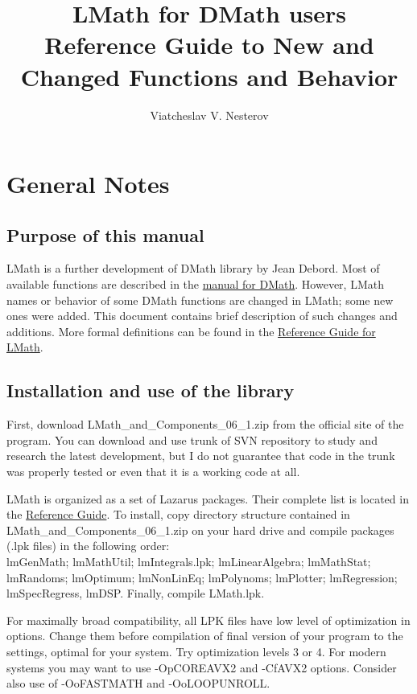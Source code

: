 \documentclass[12pt,a4paper,oneside]{article}
\begin{document}
\title{LMath for DMath users\\
{\Large Reference Guide to New and Changed Functions and Behavior}}
\author{Viatcheslav V. Nesterov}
\maketitle
\newpage
\label{toc}\tableofcontents
\newpage
\newlength{\tmplength}
\section{General Notes}
\subsection{Purpose of this manual}
LMath is a further development of DMath library by Jean Debord. Most of available functions are described in the \hyperref{file:DMath.pdf}{}{}{manual for DMath}. However, LMath names or behavior of some DMath functions are changed in LMath;  some new ones were added. This document contains brief description of such changes and additions. More formal definitions can be found in the \hyperref{file:LMath05.pdf}{}{}{Reference Guide for LMath}.  
\subsection{Installation and use of the library}
First, download LMath\_and\_Components\_06\_1.zip from the official site of the program. 
You can download and use trunk of SVN repository to study and research the latest development, but I do not guarantee that code in the trunk was properly tested or even that it is a working code at all. 

LMath is organized as a set of Lazarus packages. Their complete list is located in the \hyperref{file:LMath05.pdf}{}{}{Reference Guide}. To install, copy directory structure contained in LMath\_and\_Components\_06\_1.zip on your hard drive and compile packages (.lpk files) in the following order:\\
lmGenMath; lmMathUtil; lmIntegrals.lpk; lmLinearAlgebra; lmMathStat; lmRandoms; lmOptimum; lmNonLinEq; lmPolynoms; lmPlotter; lmRegression; \\ lmSpecRegress, lmDSP. Finally, compile LMath.lpk.
 
For maximally broad compatibility, all LPK files have low level of optimization in options. Change them before compilation of final version of your program to the settings, optimal for your system. Try optimization levels 3 or 4. For modern systems you may want to use -OpCOREAVX2 and -CfAVX2 options. Consider also use of -OoFASTMATH and -OoLOOPUNROLL. 
\end{document}
